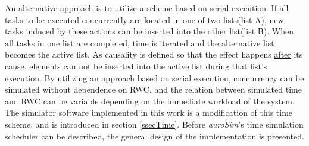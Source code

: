 		An alternative approach is to utilize a scheme based on serial execution.
		If all tasks to be executed concurrently are located in one of two lists(list A), new tasks induced by these actions can be inserted into the other list(list B).
		When all tasks in one list are completed, time is iterated and the alternative list becomes the active list.
		As causality is defined so that the effect happens \underline{after} its cause, elements can not be inserted into the active list during that list's execution.
		By utilizing an approach based on serial execution, concurrency can be simulated without dependence on RWC, and the relation between simulated time and RWC can be variable depending on the immediate workload of the system.
		The simulator software implemented in this work is a modification of this time scheme, and is introduced in section \ref{ssecTime}. %
		Before \emph{auroSim}'s time simulation scheduler can be described, the general design of the implementation is presented.



%  

